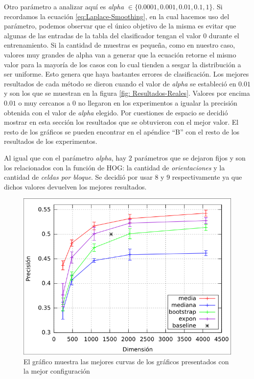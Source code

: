 	Otro parámetro a analizar aquí es \textit{alpha} $\in \{ 0.0001, 0.001, 0.01, 0.1, 1\}$. Si recordamos la ecuación \ref{eq:Laplace-Smoothing}, en la cual hacemos uso del parámetro, podemos observar que el único objetivo de la misma es evitar que algunas de las entradas de la tabla del clasificador tengan el valor $0$ durante el entrenamiento. Si la cantidad de muestras es pequeña, como en nuestro caso, valores muy grandes de alpha van a generar que la ecuación retorne el mismo valor para la mayoría de los casos con lo cual tienden a sesgar la distribución a ser uniforme.  Esto genera que haya bastantes errores de clasificación. Los mejores resultados de cada método se dieron cuando el valor de \textit{alpha} se estableció en $0.01$ y son los que se muestran en la figura \ref{fig: Resultados-Reales}. Valores por encima $0.01$ o muy cercanos a 0 no llegaron en los experimentos a igualar la precisión obtenida con el valor de \textit{alpha} elegido. Por cuestiones de espacio se decidió mostrar en esta sección los resultados que se obtuvieron con el mejor valor. El resto de los gráficos se pueden encontrar en el apéndice ``B'' con el resto de los resultados de los experimentos.

	Al igual que con el parámetro \textit{alpha}, hay $2$ parámetros que se dejaron fijos y son los relacionados con la función de HOG: la cantidad de \textit{orientaciones} y la cantidad de \textit{celdas por bloque}. Se decidió por usar $8$ y $9$ respectivamente ya que dichos valores devuelven los mejores resultados.

			\begin{figure}[htbp]
				\centering
				\centerline{
					\includegraphics[scale=0.6]{img/resultados/reales/comparativa_metodos.png}
				}
				\caption[Reales comparativa]{El gráfico muestra las mejores curvas de los gráficos presentados con la mejor configuración}
				\label{fig: Reales-Comparativa metodos}
			\end{figure}

